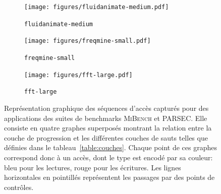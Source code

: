 \begin{figure}[p]
	\begin{subfigure}[t]{\textwidth}
  \texttt{[image: figures/fluidanimate-medium.pdf]}
		\caption{\label{bodytrack-medium}\texttt{fluidanimate-medium}}
	\end{subfigure}
	\begin{subfigure}[t]{\textwidth}
		\centering
  \texttt{[image: figures/freqmine-small.pdf]}
		\caption{\texttt{freqmine-small}}
  \end{subfigure}
	\begin{subfigure}[t]{\textwidth}
		\centering
  \texttt{[image: figures/fft-large.pdf]}
		\caption{\texttt{fft-large}}
  \end{subfigure}
  \centering
	\caption{\label{fig:profil_bodytrack}Représentation graphique des séquences d'accès capturés pour des applications des suites de benchmarks \textsc{MiBench} et \textsc{PARSEC}.
	Elle consiste en quatre graphes superposés montrant la relation entre la couche de progression et les différentes couches de sauts telles que définies dans le tableau~\ref{table:couches}.
	Chaque point de ces graphes correspond donc à un accès, dont le type est encodé par sa couleur: bleu pour les lectures, rouge pour les écritures.
	Les lignes horizontales en pointillés représentent les passages par des points de contrôles.
	}  
\end{figure}

